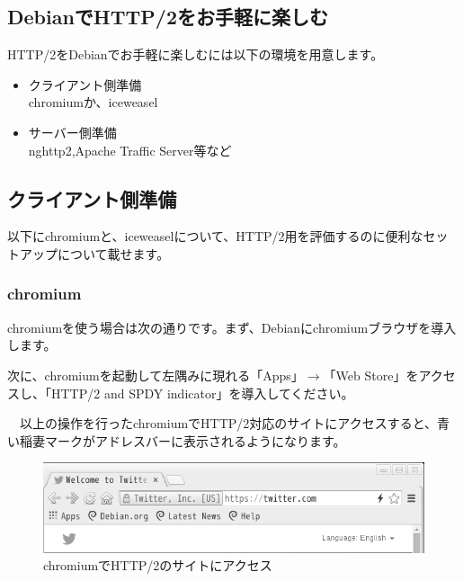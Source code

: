 \documentclass[mingoth,a4paper]{jsarticle}
\begin{document}
\subsection{DebianでHTTP/2をお手軽に楽しむ}

 HTTP/2をDebianでお手軽に楽しむには以下の環境を用意します。

 \begin{itemize}
  \item クライアント側準備\\
    chromiumか、iceweasel
  \item サーバー側準備\\
     nghttp2,Apache Traffic Server等など
 \end{itemize}  
 
 \subsection{クライアント側準備}

 以下にchromiumと、iceweaselについて、HTTP/2用を評価するのに便利なセットアップについて載せます。

 \subsubsection{chromium}

 chromiumを使う場合は次の通りです。まず、Debianにchromiumブラウザを導入します。
  
次に、chromiumを起動して左隅みに現れる「Apps」$\rightarrow$「Web Store」をアクセスし、「HTTP/2 and SPDY indicator」を導入してください。

　以上の操作を行ったchromiumでHTTP/2対応のサイトにアクセスすると、青い稲妻マークがアドレスバーに表示されるようになります。

\begin{figure}[H]
\begin{center}
 \includegraphics[width=0.9\hsize]{image201507/chromium-http-2-ready_mono.png}
\end{center}
\caption{chromiumでHTTP/2のサイトにアクセス}
\end{figure}
\end{document}
